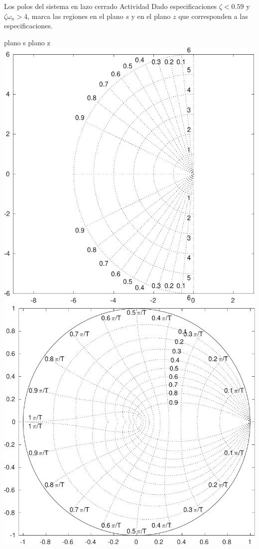 \documentclass[presentation,aspectratio=169]{beamer}
\begin{document}
\begin{frame}[label={sec:org900c368}]{Los polos del sistema en lazo cerrado}
\alert{Actividad} Dado especificaciones \(\zeta < 0.59\) y \(\zeta\omega_n > 4\), marca las regiones en el plano \(s\) y en el plano \(z\) que corresponden a las especificaciones.
\begin{center}
\alert{plano s} \hspace*{0.4\linewidth} \alert{plano z}\\
\includegraphics[height=0.61\textheight]{../../figures/sgrid-crop} \hspace*{3mm}
\includegraphics[height=0.6\textheight]{../../figures/zgrid-crop}\\
\end{center}
\end{frame}
\end{document}
